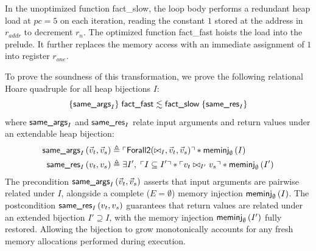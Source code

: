 \documentclass[report.tex]{subfiles}
\begin{document}
In the unoptimized function \textsf{fact\_slow},
the loop body performs a redundant heap load at $pc = 5$ on each iteration,
reading the constant $1$ stored at the address in $r_{addr}$ to decrement $r_n$.
The optimized function \textsf{fact\_fast} hoists the load into the prelude.
It further replaces the memory access with an immediate assignment of $1$
into register $r_{one}$.

To prove the soundness of this transformation,
we prove the following relational Hoare quadruple for all heap bijections $I$:
\begin{equation}
  \label{eq:hoisting-hoare}
  \hoareq{\sameargsf{I}}{\textsf{fact\_fast}}{\textsf{fact\_slow}}{\samerf{I}}
\end{equation}
where $\sameargsf{I}$ and $\samerf{I}$
relate input arguments and return values under an extendable heap bijection:
\begin{align*}
  \sameargs{I}{\vec{v}_t}{\vec{v}_s}
  & \triangleq
    \purel{\textsf{Forall2}(\sameval{I}{}{}, \vec{v}_t, \vec{v}_s)}
    \sep \meminj{I}{\emptyset}
  \\
  \samer{I}{v_t}{v_s}
  & \triangleq
    \exists I',\;
    \purel{I \subseteq I'} \sep
    \purel{\sameval{I'}{v_t}{v_s}} \sep
    \meminj{I'}{\emptyset}
\end{align*}
The precondition $\sameargs{I}{\vec{v}_t}{\vec{v}_s}$
asserts that input arguments are pairwise related under $I$,
alongside a complete ($E = \emptyset$) memory injection $\meminj{I}{\emptyset}$.
The postcondition $\samer{I}{v_t}{v_s}$ guarantees that return values
are related under an extended bijection $I' \supseteq I$,
with the memory injection $\meminj{I'}{\emptyset}$ fully restored.
Allowing the bijection to grow monotonically accounts for any fresh memory
allocations performed during execution.
\end{document}
